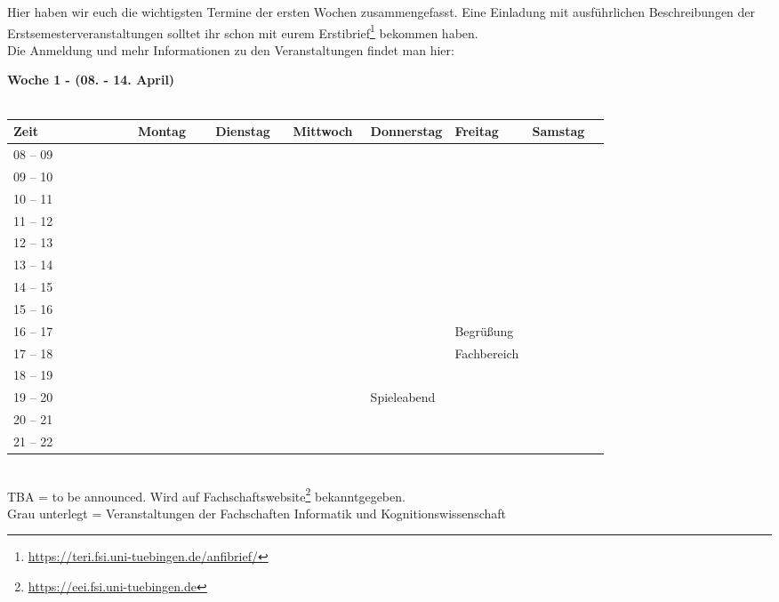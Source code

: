 
Hier haben wir euch die wichtigsten Termine der ersten Wochen
zusammengefasst. Eine Einladung mit ausführlichen Beschreibungen der
Erstsemesterveranstaltungen solltet ihr schon mit eurem
Erstibrief\footnote{\url{https://teri.fsi.uni-tuebingen.de/anfibrief/}}
bekommen haben.\\
Die Anmeldung und mehr Informationen zu den Veranstaltungen findet man hier:\\

\newcommand{\event}{\cellcolor{lightlightgray}}


\textbf{Woche 1 - (08. - 14. April)}\\
\\
\begin{tabular}{|l|p{0.13\linewidth}|p{0.13\linewidth}|p{0.13\linewidth}|p{0.13\linewidth}|p{0.13\linewidth}|p{0.13\linewidth}|} \hline
 Zeit & Montag & Dienstag & Mittwoch & Donnerstag & Freitag & Samstag \\ 
 \hline \hline
 08 -- 09 & & & & & &  \\ \cline{1-1} 
 09 -- 10 & & & & & &  \\ \cline{1-1}
 10 -- 11 & & & & & &  \\ \cline{1-1}
 11 -- 12 & & & & & &  \\ \cline{1-1}
 12 -- 13 & & & & & &  \\ \cline{1-1} 
 13 -- 14 & & & & & &  \\ \cline{1-1}
 14 -- 15 & & & & & &  \\ \cline{1-1}
 15 -- 16 & & & & & &  \\ \cline{1-1} \cline{6-6}
 16 -- 17 & & & & &\scriptsize Begrüßung &  \\ \cline{1-1} 
 17 -- 18 & & & & & \scriptsize Fachbereich &  \\ \cline{1-1} \cline{6-6}	
 18 -- 19 & & & & & &   \\ \cline{1-1}
 19 -- 20 & & & &\cellcolor{lightlightgray} \footnotesize{Spieleabend} & \cellcolor{lightlightgray}&   \\ \cline{1-1}
 20 -- 21 & & & &\cellcolor{lightlightgray} & \cellcolor{lightlightgray}&  \\ \cline{1-1}
 21 -- 22 & & & &\cellcolor{lightlightgray} & \cellcolor{lightlightgray}& \\ \hline
 \end{tabular}
\\
{\scriptsize TBA = to be announced. Wird auf Fachschaftswebsite\footnote{\url{https://eei.fsi.uni-tuebingen.de}}  bekanntgegeben.} \\
{\scriptsize Grau unterlegt = Veranstaltungen der Fachschaften Informatik und Kognitionswissenschaft }
\vfill

